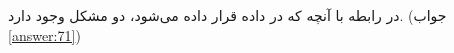 \section{}
\paragraph{}\label{hint:51}
در رابطه با آنچه که در داده  قرار داده می‌شود، دو مشکل وجود دارد. (جواب \ref{answer:71})